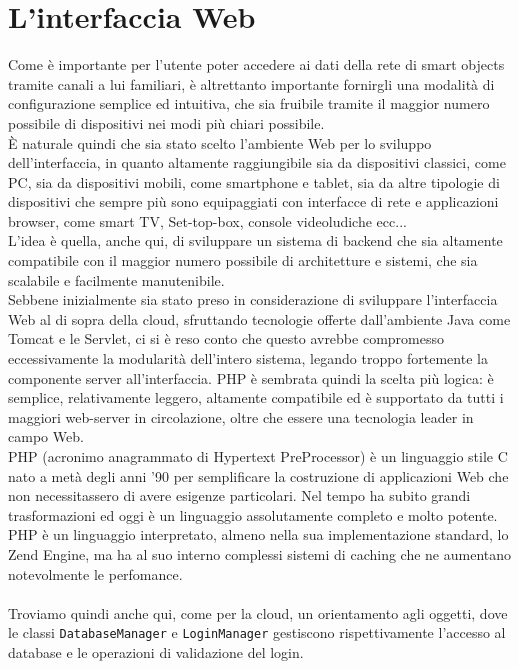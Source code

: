 \section{L'interfaccia Web}
Come è importante per l'utente poter accedere ai dati della rete di smart objects tramite canali a lui familiari, è altrettanto importante fornirgli una modalità di configurazione semplice ed intuitiva, che sia fruibile tramite il maggior numero possibile di dispositivi nei modi più chiari possibile.
\\È naturale quindi che sia stato scelto l'ambiente Web per lo sviluppo dell'interfaccia, in quanto altamente raggiungibile sia da dispositivi classici, come PC, sia da dispositivi mobili, come smartphone e tablet, sia da altre tipologie di dispositivi che sempre più sono equipaggiati con interfacce di rete e applicazioni browser, come smart TV, Set-top-box, console videoludiche ecc...
\\L'idea è quella, anche qui, di sviluppare un sistema di backend che sia altamente compatibile con il maggior numero possibile di architetture e sistemi, che sia scalabile e facilmente manutenibile.
\\Sebbene inizialmente sia stato preso in considerazione di sviluppare l'interfaccia Web al di sopra della cloud, sfruttando tecnologie offerte dall'ambiente Java come Tomcat e le Servlet, ci si è reso conto che questo avrebbe compromesso eccessivamente la modularità dell'intero sistema, legando troppo fortemente la componente server all'interfaccia. PHP è sembrata quindi la scelta più logica: è semplice, relativamente leggero, altamente compatibile ed è supportato da tutti i maggiori web-server in circolazione, oltre che essere una tecnologia leader in campo Web.
\\PHP (acronimo anagrammato di Hypertext PreProcessor) è un linguaggio stile C nato a metà degli anni '90 per semplificare la costruzione di applicazioni Web che non necessitassero di avere esigenze particolari. Nel tempo ha subito grandi trasformazioni ed oggi è un linguaggio assolutamente completo e molto potente. PHP è un linguaggio interpretato, almeno nella sua implementazione standard, lo Zend Engine, ma ha al suo interno complessi sistemi di caching che ne aumentano notevolmente le perfomance.
\\\\Troviamo quindi anche qui, come per la cloud, un orientamento agli oggetti, dove le classi {\tt DatabaseManager} e {\tt LoginManager} gestiscono rispettivamente l'accesso al database e le operazioni di validazione del login.
